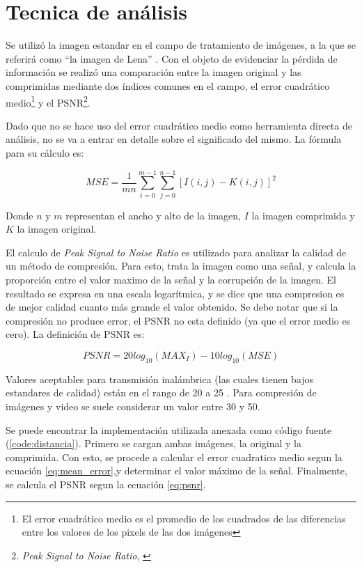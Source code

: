 \documentclass[twocolumn,a4paper,10pt]{article}
\begin{document}
\section{Tecnica de análisis}
\label{sec:tecnica}

Se utiliz\'o la imagen estandar en el campo de tratamiento de im\'agenes, a la que se referirá como ``la imagen de Lena'' \cite{lena} \cite{lenaweb}. Con el objeto de evidenciar la pérdida de información se realizó una comparación entre la imagen original y las comprimidas mediante dos índices comunes en el campo, el error cuadrático medio\footnote{El error cuadrático medio es el promedio de los cuadrados de las diferencias entre los valores de los pixels de las dos imágenes} y el PSNR\footnote{\textit{Peak Signal to Noise Ratio}, \cite{PSNR}}.  

Dado que no se hace uso del error cuadrático medio como herramienta directa de análisis, no se va a entrar en detalle sobre el significado del mismo. La fórmula para su cálculo es:

\begin{equation}
    \label{eq:mean_error}
    MSE = \frac{1}{m n} \sum_{i=0}^{m -1} \sum_{j = 0}^{n -1} [ I(i, j) - K(i, j) ]^2
\end{equation}

Donde $n$ y $m$ representan el ancho y alto de la imagen, $I$ la imagen comprimida y $K$ la imagen original.

El calculo de \textit{Peak Signal to Noise Ratio} es utilizado para analizar la calidad de un método de compresión.  Para esto, trata la imagen como una señal, y calcula la proporción entre el valor maximo de la señal y la corrupción de la imagen.  El resultado se expresa en una escala logarítmica, y se dice que una compresion es de mejor calidad cuanto más grande el valor obtenido.  Se debe notar que si la compresión no produce error, el PSNR no esta definido (ya que el error medio es cero). La definición de PSNR es:

\begin{equation}
    \label{eq:psnr}
    PSNR = 20 log_{10}(MAX_I) - 10 log_{10}(MSE)
\end{equation}

Valores aceptables para transmisión inalámbrica (las cuales tienen bajos estandares de calidad) están en el rango de 20 a 25 \cite{Wikipedia_PSNR}.
Para compresión de imágenes y video se suele considerar un valor entre 30 y 50.

Se puede encontrar la implementación utilizada anexada como código fuente (\ref{code:distancia}).
Primero se cargan ambas imágenes, la original y la comprimida.
Con esto, se procede a calcular el error cuadratico medio segun la ecuación \ref{eq:mean_error},y determinar el valor máximo de la señal.
Finalmente, se calcula el PSNR segun la ecuación \ref{eq:psnr}.
\end{document}
